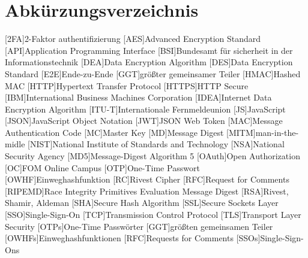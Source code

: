 \section*{Abkürzungsverzeichnis}


\begin{acronym}
	[HTTPS]\itemsep0pt %
    [2FA]{2-Faktor \gls{authentifizierung}}
    [AES]{Advanced Encryption Standard}
    [API]{Application Programming Interface}
    [BSI]{Bundesamt für sicherheit in der Informationstechnik}
    [DEA]{Data Encryption Algorithm}
    [DES]{Data Encryption Standard}
    [E2E]{Ende-zu-Ende}
    [GGT]{größter gemeinsamer Teiler}
    [H\acs{MAC}]{Hashed \acl{MAC}}
    [HTTP]{Hypertext Transfer Protocol}\label{acro:HTTP}
    [\acs{HTTP}S]{\acl{HTTP} Secure}
    [IBM]{International Business Machines Corporation}
    [IDEA]{Internet Data Encryption Algorithm}
    [ITU-T]{Internationale Fernmeldeunion}
    [JS]{JavaScript}
    [JSON]{JavaScript Object Notation}\label{acro:JSON}
    [JWT]{\acs{JSON} Web Token}
    [MAC]{Message Authentication Code}\label{acro:MAC}
    [MC]{Master Key}
    [MD]{Message Digest}
    [MITM]{man-in-the-midle}\label{acro:MITM}
    [NIST]{National Institute of Standards and Technology}
    [NSA]{National Security Agency}
    [MD5]{Message-Digest Algorithm 5}\label{acro:MD5}
    [OAuth]{Open Authorization}
    [OC]{FOM Online Campus} 
    [OTP]{One-Time Passwort}
    [OWHF]{Einweghashfunktion}
    [RC]{Rivest Cipher}
    [RFC]{Request for Comments}
    [RIPEMD]{Race Integrity Primitives Evaluation Message Digest}
    [RSA]{Rivest, Shamir, Aldeman}
    [SHA]{Secure Hash Algorithm}
    [SSL]{Secure Sockets Layer}
    [SSO]{Single-Sign-On}
    [TCP]{Transmission Control Protocol}
    [TLS]{Transport Layer Security}
    [OTPs]{One-Time Passwörter}
    [GGT]{größten gemeinsamen Teiler}
    [OWHFs]{Einweghashfunktionen}
    [RFC]{Requests for Comments}
    [SSOs]{Single-Sign-Ons}
\end{acronym}